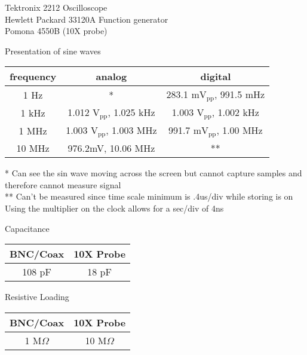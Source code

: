 \documentclass[12pt,letterpaper]{report}
\begin{document}
Tektronix 2212 Oscilloscope\\
Hewlett Packard 33120A Function generator\\
Pomona 4550B (10X probe)

\begin{center}
Presentation of sine waves\\
    \begin{tabular}{| c | c | c |}
    \hline
    
    frequency & analog & digital \\
    \hline
    1 Hz & * & 283.1 m$\text{V}_{\text{pp}}$, 991.5 mHz \\
    1 kHz & 1.012 $\text{V}_{\text{pp}}$, 1.025 kHz & 1.003 $\text{V}_{\text{pp}}$, 1.002 kHz \\
    1 MHz & 1.003 $\text{V}_{\text{pp}}$, 1.003 MHz & 991.7 m$\text{V}_{\text{pp}}$, 1.00 MHz \\
    10 MHz & 976.2mV, 10.06 MHz & ** \\
    
    \hline
    \end{tabular}
\end{center}
* Can see the sin wave moving across the screen but cannot capture samples and therefore cannot measure signal
\\[.1in]
** Can't be measured since time scale minimum is .4us/div while storing is on
\\[.3in]
Using the multiplier on the clock allows for a sec/div of 4ns
\\[.3in]

\begin{center}

Capacitance\\
	\begin{tabular}{| c | c |}
	\hline
	
	BNC/Coax & 10X Probe \\
	\hline
	108 pF & 18 pF \\

	\hline
	\end{tabular}
\end{center}

\begin{center}
Resistive Loading\\
	\begin{tabular}{| c | c |}
	\hline
	
	BNC/Coax & 10X Probe \\
	\hline
	1 M$\Omega $ & 10 M$\Omega$ \\

	\hline
	\end{tabular}
\end{center}
\end{document}
